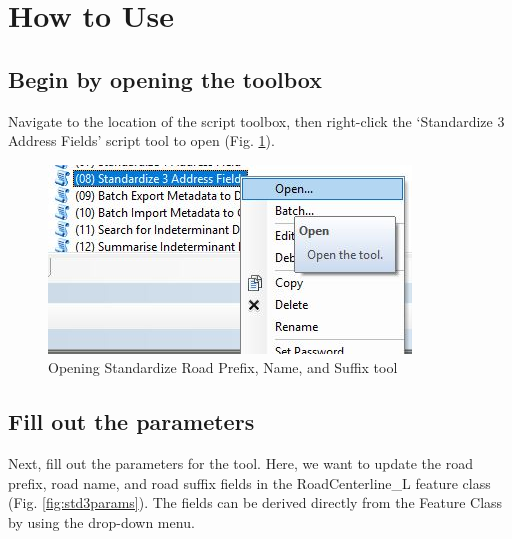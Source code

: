 \documentclass[openany]{book}
\theoremstyle{definition}
\theoremstyle{definition}
\theoremstyle{definition}
\theoremstyle{remark}
\begin{document}
\section{How to Use}\label{how-to-use-7}

\subsection{Begin by opening the
toolbox}\label{begin-by-opening-the-toolbox-7}

Navigate to the location of the script toolbox, then right-click the
`Standardize 3 Address Fields' script tool to open (Fig.
\ref{fig:std3open}).

\begin{figure}[H]

{\centering \includegraphics{figures/std3-open} 

}

\caption{Opening Standardize Road Prefix, Name, and Suffix tool}\label{fig:std3open}
\end{figure}

\subsection{Fill out the parameters}\label{fill-out-the-parameters-7}

Next, fill out the parameters for the tool. Here, we want to update the
road prefix, road name, and road suffix fields in the RoadCenterline\_L
feature class (Fig. \ref{fig:std3params}). The fields can be derived
directly from the Feature Class by using the drop-down menu.
\end{document}
